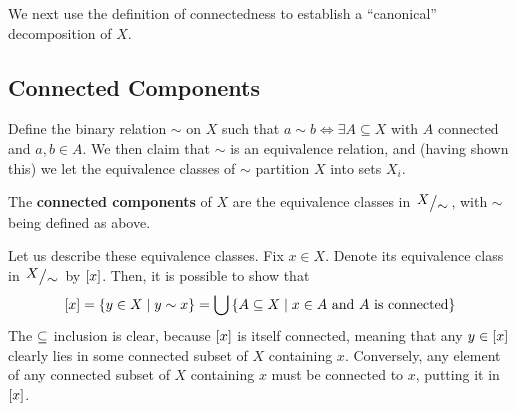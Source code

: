  We next use the definition of connectedness to establish a ``canonical'' decomposition of $X$.

 \subsection{Connected Components}

 Define the binary relation $\sim$ on $X$ such that $a \sim b\iff \exists A\subseteq X$ with $A$ connected and $a,b \in A$. We then claim that $\sim$ is an equivalence relation, and (having shown this) we let the equivalence classes of $\sim$ partition $X$ into sets $X_i$.
 \begin{boxdefinition}
     The \textbf{connected components} of $X$ are the equivalence classes in $\quotient{X}{\sim}$, with $\sim$ being defined as above.
 \end{boxdefinition}

Let us describe these equivalence classes. Fix $x \in X$. Denote its equivalence class in $\quotient{X}{\sim}$ by $\left[ x \right]$. Then, it is possible to show that
\begin{align*}
    \left[ x \right] = \left\{ y \in X \; \middle\vert \; y \sim x \right\} = \bigcup\left\{ A \subseteq X \; \middle\vert \; x \in A \text{ and } A \text{ is connected} \right\}
\end{align*}
The $\subseteq$ inclusion is clear, because $\left[ x \right]$ is itself connected, meaning that any $y \in \left[ x \right]$ clearly lies in some connected subset of $X$ containing $x$. Conversely, any element of any connected subset of $X$ containing $x$ must be connected to $x$, putting it in $\left[ x \right]$.

